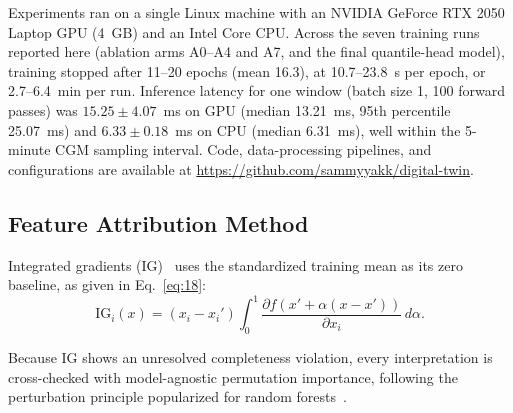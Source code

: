 \documentclass[journal]{IEEEtran}
\begin{document}
Experiments ran on a single Linux machine with an NVIDIA GeForce RTX 2050 Laptop GPU (4~GB) and an Intel Core CPU. Across the seven training runs reported here (ablation arms A0--A4 and A7, and the final quantile-head model), training stopped after 11--20 epochs (mean 16.3), at 10.7--23.8~s per epoch, or 2.7--6.4~min per run. Inference latency for one window (batch size 1, 100 forward passes) was $15.25 \pm 4.07$~ms on GPU (median 13.21~ms, 95th percentile 25.07~ms) and $6.33 \pm 0.18$~ms on CPU (median 6.31~ms), well within the 5-minute CGM sampling interval. Code, data-processing pipelines, and configurations are available at \url{https://github.com/sammyyakk/digital-twin}.

\subsection{Feature Attribution Method}

Integrated gradients (IG)~\cite{ref54} uses the standardized training mean as its zero baseline, as given in Eq.~\eqref{eq:18}:
\begin{equation}
\text{IG}_i(x) = (x_i - x_i') \int_0^1 \frac{\partial f(x' + \alpha(x - x'))}{\partial x_i}\, d\alpha.
\label{eq:18}
\end{equation}

Because IG shows an unresolved completeness violation, every interpretation is cross-checked with model-agnostic permutation importance, following the perturbation principle popularized for random forests~\cite{ref55}.
\end{document}
